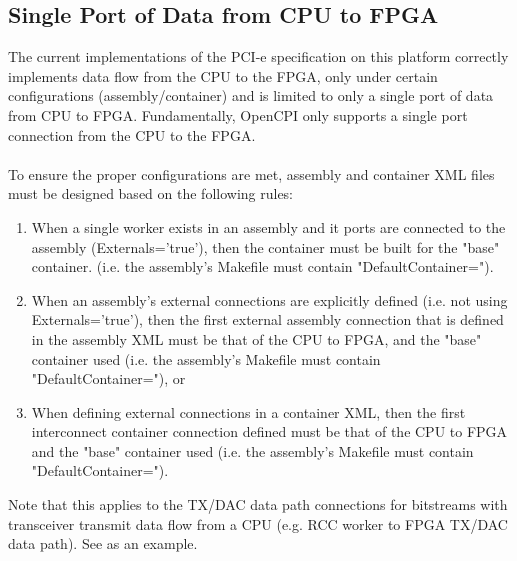 \documentclass{article}
\begin{document}
\subsection{Single Port of Data from CPU to FPGA} %
\label{bug:3783}
The current implementations of the PCI-e specification on this platform correctly implements data flow from the CPU to the FPGA, only under certain configurations (assembly/container) and is limited to only a single port of data from CPU to FPGA. Fundamentally, OpenCPI only supports a single port connection from the CPU to the FPGA. \\ \\
To ensure the proper configurations are met, assembly and container XML files must be designed based on the following rules:
\begin{enumerate}
\item When a single worker exists in an assembly and it ports are connected to the assembly (Externals='true'), then
the container must be built for the "base" container. (i.e. the assembly's Makefile must contain "DefaultContainer=").
\item When an assembly's external connections are explicitly defined (i.e. not using Externals='true'), then the first external assembly connection that is defined in the assembly XML must be that of the CPU to FPGA, and the "base" container used (i.e. the assembly's Makefile must contain "DefaultContainer="), or
\item When defining external connections in a container XML, then the first interconnect container connection defined must be that of the CPU to FPGA and the "base" container used (i.e. the assembly's Makefile must contain "DefaultContainer=").
\end{enumerate}
Note that this applies to the TX/DAC data path connections for bitstreams with transceiver transmit data flow from a CPU (e.g. RCC worker to FPGA TX/DAC data path). See  as an example.

\pagebreak
  \begin{thebibliography}{1}

  \end{thebibliography}
\end{document}
